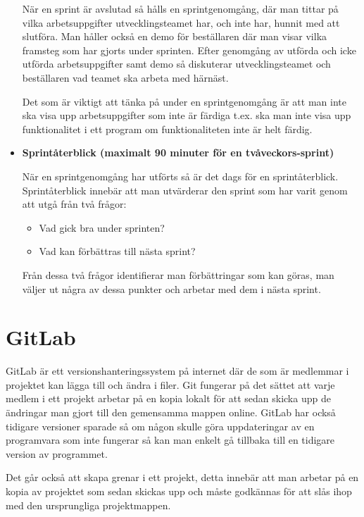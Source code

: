 \begin{itemize}
	När en sprint är avslutad så hålls en sprintgenomgång, där man tittar på vilka arbetsuppgifter utvecklingsteamet har, och inte har, hunnit med att slutföra. Man håller också en demo för beställaren där man visar vilka framsteg som har gjorts under sprinten. Efter genomgång av utförda och icke utförda arbetsuppgifter samt demo så diskuterar utvecklingsteamet och beställaren vad teamet ska arbeta med härnäst.
	 
Det som är viktigt att tänka på under en sprintgenomgång är att man inte ska visa upp arbetsuppgifter som inte är färdiga t.ex. ska man inte visa upp funktionalitet i ett program om funktionaliteten inte är helt färdig.

\item \textbf{Sprintåterblick (maximalt 90 minuter för en tvåveckors-sprint)}

När en sprintgenomgång har utförts så är det dags för en sprintåterblick. Sprintåterblick innebär att man utvärderar den sprint som har varit genom att utgå från två frågor:

\begin{itemize}
	\item Vad gick bra under sprinten?
	\item Vad kan förbättras till nästa sprint?
\end{itemize}

Från dessa två frågor identifierar man förbättringar som kan göras, man väljer ut några av dessa punkter och arbetar med dem i nästa sprint.

\end{itemize}

\section{GitLab}
GitLab är ett versionshanteringssystem på internet där de som är medlemmar i projektet kan lägga till och ändra i filer. Git fungerar på det sättet att varje medlem i ett projekt arbetar på en kopia lokalt för att sedan skicka upp de ändringar man gjort till den gemensamma mappen online. GitLab har också tidigare versioner sparade så om någon skulle göra uppdateringar av en programvara som inte fungerar så kan man enkelt gå tillbaka till en tidigare version av programmet.

Det går också att skapa grenar i ett projekt, detta innebär att man arbetar på en kopia av projektet som sedan skickas upp och måste godkännas för att slås ihop med den ursprungliga projektmappen. \cite{gitlab}

